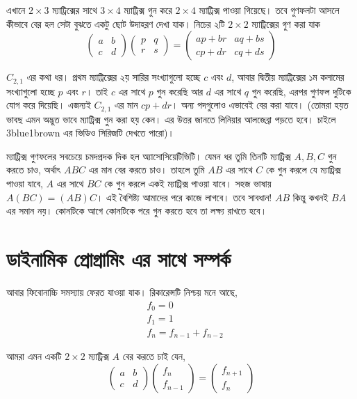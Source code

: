 এখানে $2 \times 3$ ম্যাট্রিক্সের সাথে $3 \times 4$ ম্যাট্রিক্স গুন করে $2 \times 4$ ম্যাট্রিক্স পাওয়া গিয়েছে। তবে গুণফলটা আসলে কীভাবে বের হল সেটা বুঝতে একটু ছোট উদাহরণ দেখা যাক। নিচের ২টি $2 \times 2$ ম্যাট্রিক্সের গুণ করা যাক
 $$
\begin{pmatrix}
a & b \\
c & d
\end{pmatrix}
\begin{pmatrix}
p & q \\
r & s
\end{pmatrix} = 
\begin{pmatrix}
ap + br & aq + bs \\
cp + dr & cq + ds
\end{pmatrix}
$$

$C_{2, 1}$ এর কথা ধর। প্রথম ম্যাট্রিক্সের ২য় সারির সংখ্যাগুলো হচ্ছে $c$ এবং $d$, আবার দ্বিতীয় ম্যাট্রিক্সের ১ম কলামের সংখ্যাগুলো হচ্ছে $p$ এবং $r$। তাই $c$ এর সাথে $p$ গুন করেছি আর $d$ এর সাথে $q$ গুন  করেছি, এরপর গুণফল দুটিকে যোগ করে দিয়েছি। এজন্যই $C_{2, 1}$ এর মান $cp + dr$। অন্য পদগুলোও এভাবেই বের করা যাবে। (তোমরা হয়ত ভাবছ এমন অদ্ভুত ভাবে ম্যাট্রিক্স গুন করা হয় কেন। এর উত্তর জানতে লিনিয়ার আলজেব্রা পড়তে হবে। চাইলে 3blue1brown এর ভিডিও সিরিজটি দেখতে পারো)। 

ম্যাট্রিক্স গুণফলের সবচেয়ে চমদপ্রদক দিক হল অ্যাসোসিয়েটিভিটি। যেমন ধর তুমি তিনটি ম্যাট্রিক্স $A, B, C$ গুন করতে চাও, অর্থাৎ $ABC$ এর মান বের করতে চাও। তাহলে তুমি $AB$ এর সাথে $C$ কে গুন করলে যে ম্যাট্রিক্স পাওয়া যাবে, $A$ এর সাথে $BC$ কে গুন করলে একই ম্যাট্রিক্স পাওয়া যাবে। সহজ ভাষায় $A(BC) = (AB)C$। এই বৈশিষ্ট্য আমাদের পরে কাজে লাগবে। তবে সাবধান! $AB$ কিন্তু কখনই $BA$ এর সমান নয়। কোনটিকে আগে কোনটিকে পরে গুন করতে হবে তা লক্ষ্য রাখতে হবে। 

\section{ডাইনামিক প্রোগ্রামিং এর সাথে সম্পর্ক}
আবার ফিবোনাচ্চি সমস্যায় ফেরত যাওয়া যাক। রিকারেন্সটি নিশ্চয় মনে আছে,
\begin{align*}
& f_{0} = 0 \\
& f_{1} = 1 \\
& f_{n} = f_{n - 1} + f_{n - 2}
\end{align*}

আমরা এমন একটি $2 \times 2$ ম্যাট্রিক্স $A$ বের করতে চাই যেন,
$$
\begin{pmatrix}
a & b \\
c & d
\end{pmatrix} 
\begin{pmatrix}
f_{n} \\
f_{n - 1}
\end{pmatrix}
= 
\begin{pmatrix}
f_{n + 1} \\
f_{n}
\end{pmatrix}
$$ 

